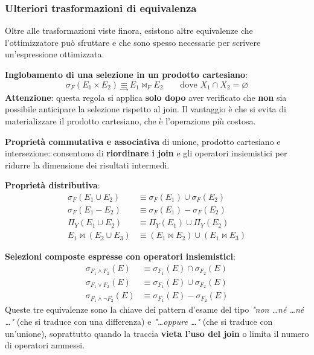 \documentclass[a4paper,twoside]{article}
\begin{document}
\subsubsection{Ulteriori trasformazioni di equivalenza}
Oltre alle trasformazioni viste finora, esistono altre equivalenze che l'ottimizzatore
può sfruttare e che sono spesso necessarie per scrivere un'espressione ottimizzata.

\vspace{1em}
\noindent
\textbf{Inglobamento di una selezione in un prodotto cartesiano}:
\[
  \sigma_F(E_1 \times E_2) \underset{\longrightarrow}{\equiv} E_1 \bowtie_F E_2
  \qquad \text{dove } X_1 \cap X_2 = \varnothing
\]
\textbf{Attenzione}: questa regola si applica \textbf{solo dopo} aver verificato che
\textbf{non} sia possibile anticipare la selezione rispetto al join. Il vantaggio è che
si evita di materializzare il prodotto cartesiano, che è l'operazione più costosa.

\vspace{1em}
\noindent
\textbf{Proprietà commutativa e associativa} di unione, prodotto cartesiano e
intersezione: consentono di \textbf{riordinare i join} e gli operatori insiemistici per
ridurre la dimensione dei risultati intermedi.

\vspace{1em}
\noindent
\textbf{Proprietà distributiva}:
\[
  \begin{aligned}
    \sigma_F(E_1 \cup E_2) &\equiv \sigma_F(E_1) \cup \sigma_F(E_2)\\
    \sigma_F(E_1 - E_2) &\equiv \sigma_F(E_1) - \sigma_F(E_2)\\
    \Pi_Y(E_1 \cup E_2) &\equiv \Pi_Y(E_1) \cup \Pi_Y(E_2)\\
    E_1 \bowtie (E_2 \cup E_3) &\equiv (E_1 \bowtie E_2) \cup (E_1 \bowtie E_3)
  \end{aligned}
\]

\vspace{1em}
\noindent
\textbf{Selezioni composte espresse con operatori insiemistici}:
\[
  \begin{aligned}
    \sigma_{F_1 \land F_2}(E) &\equiv \sigma_{F_1}(E) \cap \sigma_{F_2}(E)\\
    \sigma_{F_1 \lor F_2}(E) &\equiv \sigma_{F_1}(E) \cup \sigma_{F_2}(E)\\
    \sigma_{F_1 \land \lnot F_2}(E) &\equiv \sigma_{F_1}(E) - \sigma_{F_2}(E)
  \end{aligned}
\]
Queste tre equivalenze sono la chiave dei pattern d'esame del tipo
\textit{"non \ldots né \ldots né \ldots"} (che si traduce con una differenza) e
\textit{"\ldots oppure \ldots"} (che si traduce con un'unione), soprattutto quando la
traccia \textbf{vieta l'uso del join} o limita il numero di operatori ammessi.
\end{document}
